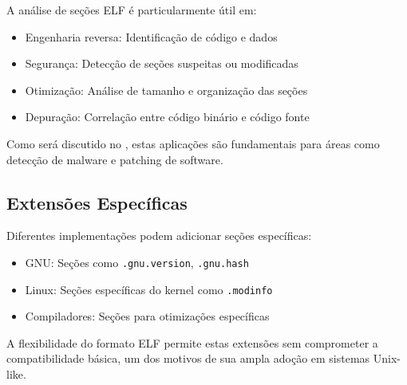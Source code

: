 A análise de seções ELF é particularmente útil em:

\begin{itemize}
    \item Engenharia reversa: Identificação de código e dados
    \item Segurança: Detecção de seções suspeitas ou modificadas
    \item Otimização: Análise de tamanho e organização das seções
    \item Depuração: Correlação entre código binário e código fonte
\end{itemize}

Como será discutido no , estas aplicações são fundamentais para áreas como detecção de malware e patching de software.

\subsection{Extensões Específicas}\label{subsec:section_extensions}

Diferentes implementações podem adicionar seções específicas:

\begin{itemize}
    \item GNU: Seções como \texttt{.gnu.version}, \texttt{.gnu.hash}
    \item Linux: Seções específicas do kernel como \texttt{.modinfo}
    \item Compiladores: Seções para otimizações específicas
\end{itemize}

A flexibilidade do formato ELF permite estas extensões sem comprometer a compatibilidade básica, um dos motivos de sua ampla adoção em sistemas Unix-like.